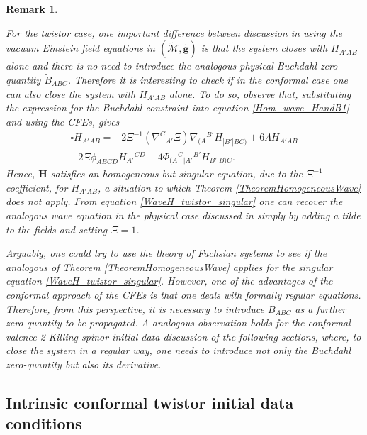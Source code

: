 \documentclass[10pt,a4paper]{article}
\theoremstyle{plain}
\newtheorem{remark}{Remark}
\def\bmg{{\bm g}}
\def\bmH{{\bm H}}
\begin{document}
\begin{remark}
\em{
For the twistor case, one important difference between discussion in
\cite{GasVal15}
using the vacuum Einstein field equations in  $(\tilde{\mathcal{M}},\tilde{\bmg})$
is that the system closes with $\tilde{H}_{A'AB}$ alone and there is no need
to introduce the analogous physical Buchdahl zero-quantity $\tilde{B}_{ABC}$.
Therefore it is interesting to check if in the conformal case
one can also close the system with $H_{A'AB}$ alone.
To do so, observe that, substituting the expression for
the Buchdahl constraint into equation
\eqref{Hom_wave_HandB1} and using the CFEs, gives
\begin{multline}\label{WaveH_twistor_singular}
  \square H_{A'AB} =  - 2\Xi^{-1} (\nabla^{C}{}_{A'}\Xi)
    \nabla_{(A}{}^{B'}H_{|B'|BC)}+ 6 \Lambda H_{A'AB} \\-2 \Xi
  \phi _{ABCD}H_{A'}{}^{CD} -4
  \Phi_{(A}{}^{C}{}_{|A'}{}^{B'}H_{B'|B)C}.
\end{multline}
Hence, $\bmH$ satisfies  an homogeneous but
\emph{singular equation}, due to the $\Xi^{-1}$ coefficient,
for $H_{A'AB}$, a situation to which Theorem
\ref{TheoremHomogeneousWave} does not apply.
From equation \eqref{WaveH_twistor_singular} one can
recover the analogous wave equation in the physical case
discussed in \cite{GasVal15} simply by adding a tilde to the fields and
setting $\Xi=1$.

Arguably, one could try
to use the theory of Fuchsian systems to see if the analogous of
Theorem \ref{TheoremHomogeneousWave} applies for the singular equation
\eqref{WaveH_twistor_singular}.  However, one of the advantages of the
conformal approach of the CFEs is that one deals with formally regular equations.
Therefore, from this perspective, it is necessary to introduce $B_{ABC}$ as a further zero-quantity to
be propagated.  A analogous observation holds for the conformal valence-2
Killing spinor initial data discussion of the following sections,
where, to close the system in a regular way, one needs to introduce not
only the Buchdahl zero-quantity but also its derivative.}
\end{remark}



\subsection{Intrinsic conformal twistor initial data conditions}
\end{document}
